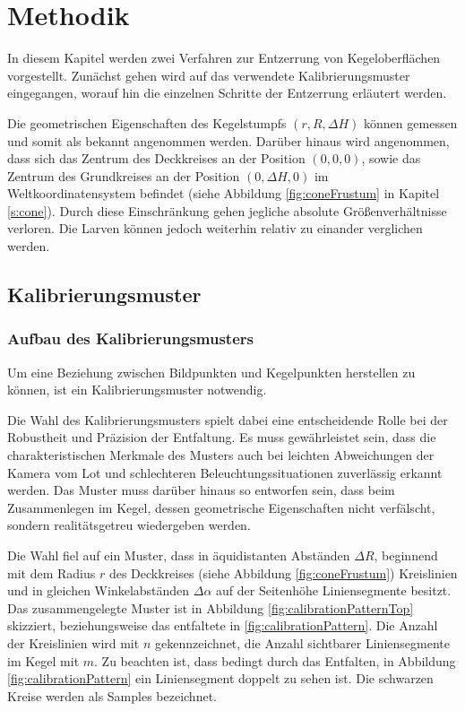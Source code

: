 \chapter{Methodik}
\label{ch:method}
In diesem Kapitel werden zwei Verfahren zur Entzerrung von Kegeloberflächen vorgestellt.
Zunächst gehen wird auf das verwendete Kalibrierungsmuster eingegangen, worauf hin die einzelnen Schritte der Entzerrung erläutert werden.

Die geometrischen Eigenschaften des Kegelstumpfs $(r, R, \Delta H)$ können gemessen und somit als bekannt angenommen werden.
Darüber hinaus wird angenommen, dass sich das Zentrum des Deckkreises an der Position $(0,0,0)$, sowie das Zentrum des Grundkreises an der Position $(0,\Delta H, 0)$ im Weltkoordinatensystem befindet (siehe Abbildung \ref{fig:coneFrustum} in Kapitel \ref{s:cone}). Durch diese Einschränkung gehen jegliche absolute Größenverhältnisse verloren. Die Larven können jedoch weiterhin relativ zu einander verglichen werden.


\section{Kalibrierungsmuster}
\label{s:calibrationPattern}
\subsection{Aufbau des Kalibrierungsmusters}
Um eine Beziehung zwischen Bildpunkten und Kegelpunkten herstellen zu können, ist ein Kalibrierungsmuster notwendig.

Die Wahl des Kalibrierungsmusters spielt dabei eine entscheidende Rolle bei der Robustheit und Präzision der Entfaltung. Es muss gewährleistet sein, dass die charakteristischen Merkmale des Musters auch bei leichten Abweichungen der Kamera vom Lot und schlechteren Beleuchtungssituationen zuverlässig erkannt werden. Das Muster muss darüber hinaus so entworfen sein, dass beim Zusammenlegen im Kegel, dessen geometrische Eigenschaften nicht verfälscht, sondern realitätsgetreu wiedergeben werden.

Die Wahl fiel auf ein Muster, dass in äquidistanten Abständen $\Delta R$, beginnend mit dem Radius $r$ des Deckkreises (siehe Abbildung \ref{fig:coneFrustum}) Kreislinien und in gleichen Winkelabständen $\Delta \alpha$ auf der Seitenhöhe Liniensegmente besitzt. Das zusammengelegte Muster ist in Abbildung \ref{fig:calibrationPatternTop} skizziert, beziehungsweise das entfaltete in \ref{fig:calibrationPattern}. Die Anzahl der Kreislinien wird mit $n$ gekennzeichnet, die Anzahl sichtbarer Liniensegmente im Kegel mit $m$. Zu beachten ist, dass bedingt durch das Entfalten, in Abbildung \ref{fig:calibrationPattern}  ein Liniensegment doppelt zu sehen ist. Die schwarzen Kreise werden als Samples bezeichnet.

